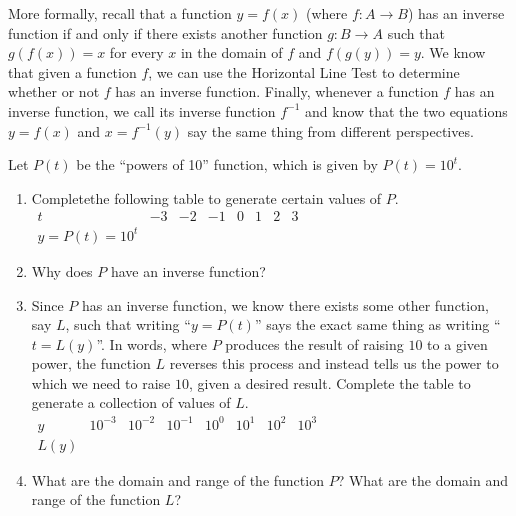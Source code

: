 \documentclass[nooutcomes]{ximera}
\begin{document}
More formally, recall that a function \(y = f(x)\) (where \(f : A \to B\)) has an inverse function if and only if there exists another function \(g : B \to A\) such that \(g(f(x)) = x\) for every \(x\) in the domain of \(f\) and \(f(g(y)) = y\).    We know that given a function \(f\), we can use the Horizontal Line Test to determine whether or not \(f\) has an inverse function.  Finally, whenever a function \(f\) has an inverse function, we call its inverse function \(f^{-1}\) and know that the two equations \(y = f(x)\) and \(x = f^{-1}(y)\) say the same thing from different perspectives.%
\begin{exploration}

Let \(P(t)\) be the ``powers of 10'' function, which is given by \(P(t) = 10^t\).%

\begin{enumerate}[label=\alph*.]
\item
Completethe following table to generate certain values of \(P\).%
\\
$
\begin{array}{llllllll}
t&-3&-2&-1&0&1&2&3\\
\hline
y = P(t) = 10^t&~&~&~&~&~&~&
\end{array}
$
\item
Why does \(P\) have an inverse function?%
\item
Since \(P\) has an inverse function, we know there exists some other function, say \(L\), such that writing ``\(y = P(t)\)'' says the exact same thing as writing ``\(t = L(y)\)''.  In words, where \(P\) produces the result of raising \(10\) to a given power, the function \(L\) reverses this process and instead tells us the power to which we need to raise \(10\), given a desired result.  Complete the table to generate a collection of values of \(L\).%
\\
$
\begin{array}{llllllll}
y&10^{-3}&10^{-2}&10^{-1}&10^{0}&10^{1}&10^{2}&10^{3}\\
\hline
L(y)&~&~&~&~&~&~&
\end{array}
$
\item
What are the domain and range of the function \(P\)?  What are the domain and range of the function \(L\)?%
\end{enumerate}
%
\end{exploration}

%
%
%
\end{document}

